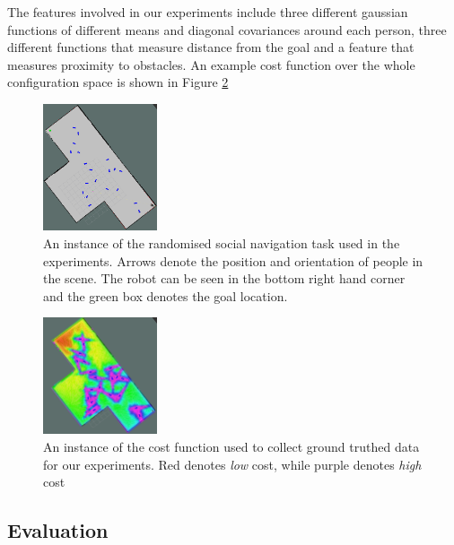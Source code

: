 \documentclass{article}  %
\begin{document}
	The features involved in our experiments include three different gaussian functions of different means and diagonal covariances around each person, three different functions that measure distance from the goal and a feature that measures proximity to obstacles. An example cost function over the whole configuration space is shown in Figure \ref{fig:cost_f} 

	\begin{figure}
	\centering
	    \includegraphics[width=0.30\textwidth]{images/people.png}
	  \caption{An instance of the randomised social navigation task used in the experiments. Arrows denote the position and orientation of people in the scene. The robot can be seen in the bottom right hand corner and the green box denotes the goal location.} \label{fig:exp_setting}
	\end{figure}

	\begin{figure}
	\centering
	    \includegraphics[width=0.30\textwidth]{images/cost_f.png}
	  \caption{An instance of the cost function used to collect ground truthed data for our experiments. Red denotes \emph{low} cost, while purple denotes \emph{high} cost} \label{fig:cost_f}
	\end{figure}
	\subsection{Evaluation}
\end{document}
